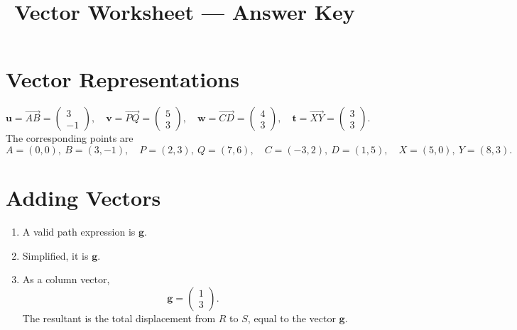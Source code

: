 \documentclass[12pt,a4paper]{article}
\title{Vector Worksheet --- Answer Key}
\author{}
\date{}
\begin{document}
\maketitle
\thispagestyle{empty}

\section*{Vector Representations}
\[
\mathbf{u}=\overrightarrow{AB}=\begin{pmatrix}3\\-1\end{pmatrix},\quad
\mathbf{v}=\overrightarrow{PQ}=\begin{pmatrix}5\\3\end{pmatrix},\quad
\mathbf{w}=\overrightarrow{CD}=\begin{pmatrix}4\\3\end{pmatrix},\quad
\mathbf{t}=\overrightarrow{XY}=\begin{pmatrix}3\\3\end{pmatrix}.
\]
The corresponding points are
\[
A=(0,0),\ B=(3,-1),\quad P=(2,3),\ Q=(7,6),\quad C=(-3,2),\ D=(1,5),\quad X=(5,0),\ Y=(8,3).
\]

\section*{Adding Vectors}
\begin{enumerate}
    \item A valid path expression is \(\boxed{\mathbf{g}}\).
    \item Simplified, it is \(\boxed{\mathbf{g}}\).
    \item As a column vector,
    \[
    \boxed{\mathbf{g}=\begin{pmatrix}1\\3\end{pmatrix}}.
    \]
    The resultant is the total displacement from \(R\) to \(S\), equal to the vector \(\mathbf{g}\).
\end{enumerate}
\end{document}
